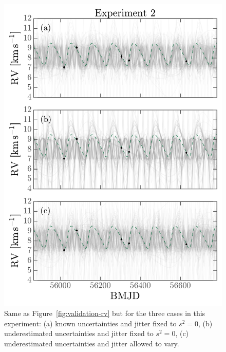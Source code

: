 \documentclass[manuscript, letterpaper]{aastex6}
\newcommand{\figname}{Figure}
\begin{document}
\begin{figure}[p]
\begin{center}
\includegraphics[width=\textwidth]{figures/undunc-rv-curves.pdf}
\end{center}
\caption{%
Same as \figname~\ref{fig:validation-rv} but for the three cases in this experiment:
(a) known uncertainties and jitter fixed to $s^2 = 0$, (b) underestimated
uncertainties and jitter fixed to $s^2 = 0$, (c) underestimated uncertainties
and jitter allowed to vary.
\label{fig:undunc-rv}}
\end{figure}
\end{document}
